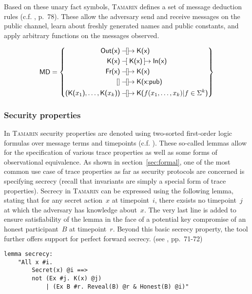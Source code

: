 \noindent
Based on these unary fact symbols, \textsc{Tamarin} defines a set of message deduction rules (c.f. \cite{meier2013advancing}, p.~78).
These allow the adversary send and receive messages on the public channel, learn about freshly generated names and public constants, and apply arbitrary functions on the messages observed.

\begin{equation*}
    \textsf{MD} = \left\{
        \begin{aligned}
            \textsf{Out(x)} &\ltracerule\rtracerule \textsf{K(x)}\\
            \textsf{K(x)} &\tracerule{\textsf{K(x)}} \textsf{In(x)}\\
            \textsf{Fr(x)} &\ltracerule\rtracerule \textsf{K(x)}\\
            [] &\ltracerule\rtracerule \textsf{K(x:pub)}\\
            \textsf{(K(}x_1\textsf{)}, \ldots, \textsf{K(}x_k\textsf{))} &\ltracerule\rtracerule \textsf{K(}f(x_1, \ldots, x_k) | f \in \Sigma^k\textsf{)}
        \end{aligned}
    \right\}
\end{equation*}

\subsubsection{Security properties}

In \textsc{Tamarin} security properties are denoted using two-sorted first-order logic formulas over message terms and timepoints (c.f. \cite{meier2013advancing}).
These so-called lemmas allow for the specification of various trace properties as well as some forms of observational equivalence.
As shown in section~\ref{sec:formal}, one of the most common use case of trace properties as far as security protocols are concerned is specifying secrecy (recall that invariants are simply a special form of trace properties).
Secrecy in \textsc{Tamarin} can be expressed using the following lemma, stating that for any secret action~$x$ at timepoint~$i$, there exsists no timepoint~$j$ at which the adversary has knowledge about~$x$.
The very last line is added to ensure satisfiability of the lemma in the face of a potential key compromise of an honest participant~$B$ at timepoint~$r$.
Beyond this basic secrecy property, the tool further offers support for perfect forward secrecy. (see \cite{tamarin2019manual}, pp.~71-72)

\begin{lstlisting}[caption={Tamarin secrecy query, according to \cite{tamarin2019manual}, p.~72},label={lst:tamarin-secrecy}]
lemma secrecy:
    "All x #i.
        Secret(x) @i ==>
        not (Ex #j. K(x) @j)
            | (Ex B #r. Reveal(B) @r & Honest(B) @i)"
\end{lstlisting}

